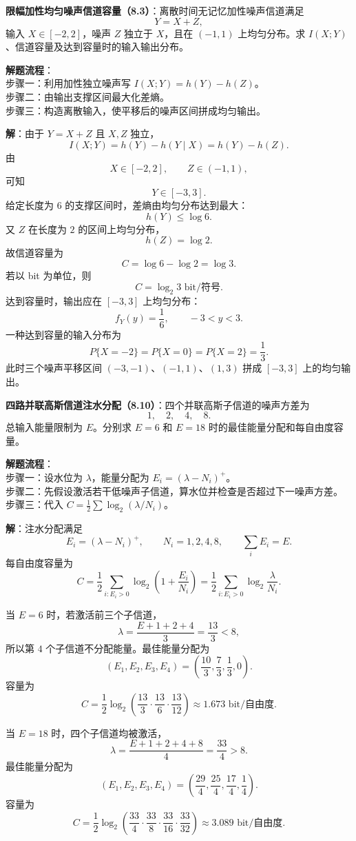 \begin{example}
\label{hw:ch8-3-amplitude-limited-uniform-noise-capacity}
\textbf{限幅加性均匀噪声信道容量（8.3）}：离散时间无记忆加性噪声信道满足
\[
Y=X+Z,
\]
输入 $X\in[-2,2]$，噪声 $Z$ 独立于 $X$，且在 $(-1,1)$ 上均匀分布。求 $I(X;Y)$、信道容量及达到容量时的输入输出分布。

\noindent \textbf{解题流程}：\\[2pt]
步骤一：利用加性独立噪声写 $I(X;Y)=h(Y)-h(Z)$。\\
步骤二：由输出支撑区间最大化差熵。\\
步骤三：构造离散输入，使平移后的噪声区间拼成均匀输出。

\textbf{解}：由于 $Y=X+Z$ 且 $X,Z$ 独立，
\[
I(X;Y)=h(Y)-h(Y\mid X)=h(Y)-h(Z).
\]
由
\[
X\in[-2,2],
\qquad
Z\in(-1,1),
\]
可知
\[
Y\in[-3,3].
\]
给定长度为 $6$ 的支撑区间时，差熵由均匀分布达到最大：
\[
h(Y)\le\log 6.
\]
又 $Z$ 在长度为 $2$ 的区间上均匀分布，
\[
h(Z)=\log 2.
\]
故信道容量为
\[
C=\log 6-\log 2=\log 3.
\]
若以 bit 为单位，则
\[
C=\log_2 3\text{ bit/符号}.
\]
达到容量时，输出应在 $[-3,3]$ 上均匀分布：
\[
f_Y(y)=\frac16,
\qquad -3<y<3.
\]
一种达到容量的输入分布为
\[
P\{X=-2\}=P\{X=0\}=P\{X=2\}=\frac13.
\]
此时三个噪声平移区间 $(-3,-1)$、$(-1,1)$、$(1,3)$ 拼成 $[-3,3]$ 上的均匀输出。
\end{example}

\begin{example}
\label{hw:ch8-10-parallel-gaussian-water-filling}
\textbf{四路并联高斯信道注水分配（8.10）}：四个并联高斯子信道的噪声方差为
\[
1,
\quad2,
\quad4,
\quad8.
\]
总输入能量限制为 $E$。分别求 $E=6$ 和 $E=18$ 时的最佳能量分配和每自由度容量。

\noindent \textbf{解题流程}：\\[2pt]
步骤一：设水位为 $\lambda$，能量分配为 $E_i=(\lambda-N_i)^+$。\\
步骤二：先假设激活若干低噪声子信道，算水位并检查是否超过下一噪声方差。\\
步骤三：代入 $C=\frac12\sum\log_2(\lambda/N_i)$。

\textbf{解}：注水分配满足
\[
E_i=(\lambda-N_i)^+,
\qquad
N_i=1,2,4,8,
\qquad
\sum_iE_i=E.
\]
每自由度容量为
\[
C=\frac12\sum_{i:E_i>0}\log_2\left(1+\frac{E_i}{N_i}\right)
=\frac12\sum_{i:E_i>0}\log_2\frac{\lambda}{N_i}.
\]

当 $E=6$ 时，若激活前三个子信道，
\[
\lambda=\frac{E+1+2+4}{3}=\frac{13}{3}<8,
\]
所以第 $4$ 个子信道不分配能量。最佳能量分配为
\[
(E_1,E_2,E_3,E_4)=\left(\frac{10}{3},\frac{7}{3},\frac{1}{3},0\right).
\]
容量为
\[
C=\frac12\log_2\left(\frac{13}{3}\cdot\frac{13}{6}\cdot\frac{13}{12}\right)
\approx1.673\text{ bit/自由度}.
\]

当 $E=18$ 时，四个子信道均被激活，
\[
\lambda=\frac{E+1+2+4+8}{4}=\frac{33}{4}>8.
\]
最佳能量分配为
\[
(E_1,E_2,E_3,E_4)=\left(\frac{29}{4},\frac{25}{4},\frac{17}{4},\frac14\right).
\]
容量为
\[
C=\frac12\log_2\left(\frac{33}{4}\cdot\frac{33}{8}\cdot\frac{33}{16}\cdot\frac{33}{32}\right)
\approx3.089\text{ bit/自由度}.
\]
\end{example}

